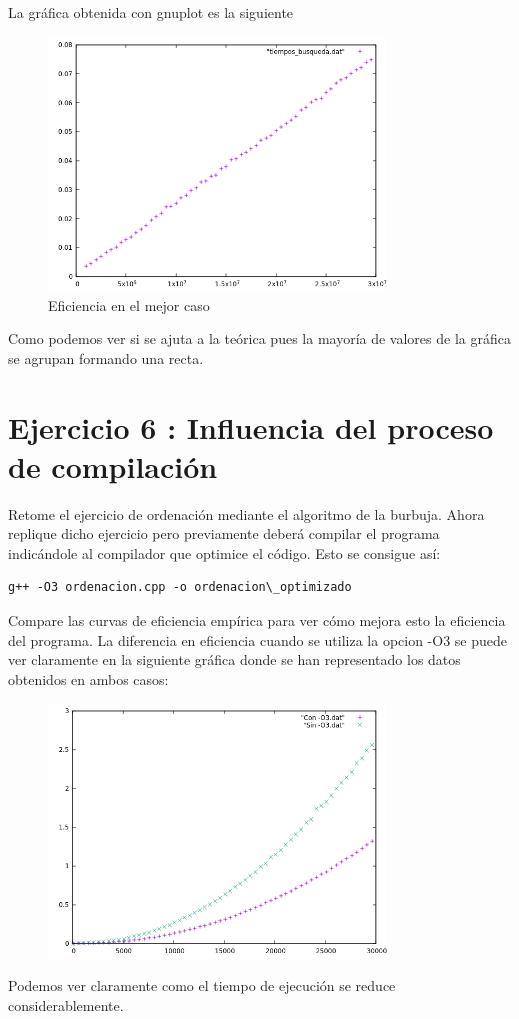 \documentclass{article}
\begin{document}
La gráfica obtenida con gnuplot es la siguiente
\begin{figure}[H]
  \caption{Eficiencia en el mejor caso}
  \centering
  \includegraphics[width=0.8\textwidth]{ejer5/grafica.png}
\end{figure}
Como podemos ver si se ajuta a la teórica pues la mayoría de valores
de la gráfica se agrupan formando una recta.
\clearpage
\section{Ejercicio 6 : Influencia del proceso de compilación}
Retome el ejercicio de ordenación mediante el algoritmo de la burbuja. Ahora replique
dicho ejercicio pero previamente deberá compilar el programa indicándole al compilador
que optimice el código. Esto se consigue así:
\begin{verbatim}
g++ -O3 ordenacion.cpp -o ordenacion\_optimizado
\end{verbatim}
Compare las curvas de eficiencia empírica para ver cómo mejora esto la eficiencia del programa.
\clearpage
La diferencia en eficiencia cuando se utiliza la opcion -O3 se puede ver claramente en la siguiente gráfica donde se han representado los datos obtenidos en ambos casos: 
\begin{figure}[H]
  \centering
  \includegraphics[width=0.8\textwidth]{comparacion.png}
\end{figure}
Podemos ver claramente como el tiempo de ejecución se reduce considerablemente.
\end{document}
